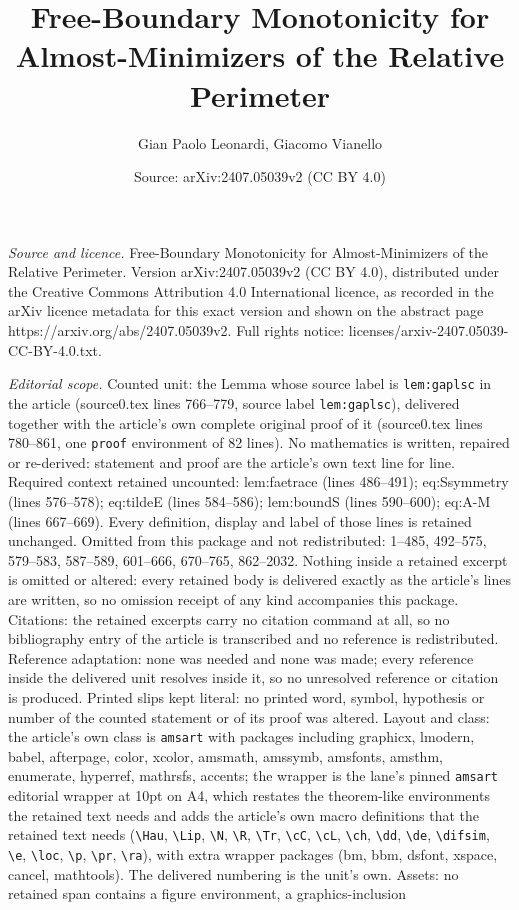 \documentclass[10pt,a4paper]{amsart}
\title[Free-Boundary Monotonicity for Almost-Minimizers of the Rela]{Free-Boundary Monotonicity for Almost-Minimizers of the Relative Perimeter}
\author{Gian Paolo Leonardi, Giacomo Vianello}
\date{Source: arXiv:2407.05039v2 (CC BY 4.0)}
\begin{document}
\maketitle

\noindent\emph{Source and licence.} Free-Boundary Monotonicity for Almost-Minimizers of the Relative Perimeter. Version arXiv:2407.05039v2 (CC BY 4.0), distributed under the Creative Commons Attribution 4.0 International licence, as recorded in the arXiv licence metadata for this exact version and shown on the abstract page https://arxiv.org/abs/2407.05039v2. Full rights notice: licenses/arxiv-2407.05039-CC-BY-4.0.txt.\par\smallskip

\noindent\textit{Editorial scope.} Counted unit: the Lemma whose source label is \texttt{lem:gaplsc} in the article (source0.tex lines 766--779, source label \texttt{lem:gaplsc}), delivered together with the article's own complete original proof of it (source0.tex lines 780--861, one \texttt{proof} environment of 82 lines). No mathematics is written, repaired or re-derived: statement and proof are the article's own text line for line. Required context retained uncounted: lem:faetrace (lines 486--491); eq:Ssymmetry (lines 576--578); eq:tildeE (lines 584--586); lem:boundS (lines 590--600); eq:A-M (lines 667--669). Every definition, display and label of those lines is retained unchanged. Omitted from this package and not redistributed: 1--485, 492--575, 579--583, 587--589, 601--666, 670--765, 862--2032. Nothing inside a retained excerpt is omitted or altered: every retained body is delivered exactly as the article's lines are written, so no omission receipt of any kind accompanies this package. Citations: the retained excerpts carry no citation command at all, so no bibliography entry of the article is transcribed and no reference is redistributed. Reference adaptation: none was needed and none was made; every reference inside the delivered unit resolves inside it, so no unresolved reference or citation is produced. Printed slips kept literal: no printed word, symbol, hypothesis or number of the counted statement or of its proof was altered. Layout and class: the article's own class is \texttt{amsart} with packages including graphicx, lmodern, babel, afterpage, color, xcolor, amsmath, amssymb, amsfonts, amsthm, enumerate, hyperref, mathrsfs, accents; the wrapper is the lane's pinned \texttt{amsart} editorial wrapper at 10pt on A4, which restates the theorem-like environments the retained text needs and adds the article's own macro definitions that the retained text needs (\texttt{\textbackslash Hau}, \texttt{\textbackslash Lip}, \texttt{\textbackslash N}, \texttt{\textbackslash R}, \texttt{\textbackslash Tr}, \texttt{\textbackslash cC}, \texttt{\textbackslash cL}, \texttt{\textbackslash ch}, \texttt{\textbackslash dd}, \texttt{\textbackslash de}, \texttt{\textbackslash difsim}, \texttt{\textbackslash e}, \texttt{\textbackslash loc}, \texttt{\textbackslash p}, \texttt{\textbackslash pr}, \texttt{\textbackslash ra}), with extra wrapper packages (bm, bbm, dsfont, xspace, cancel, mathtools). The delivered numbering is the unit's own. Assets: no retained span contains a figure environment, a graphics-inclusion 
\end{document}
